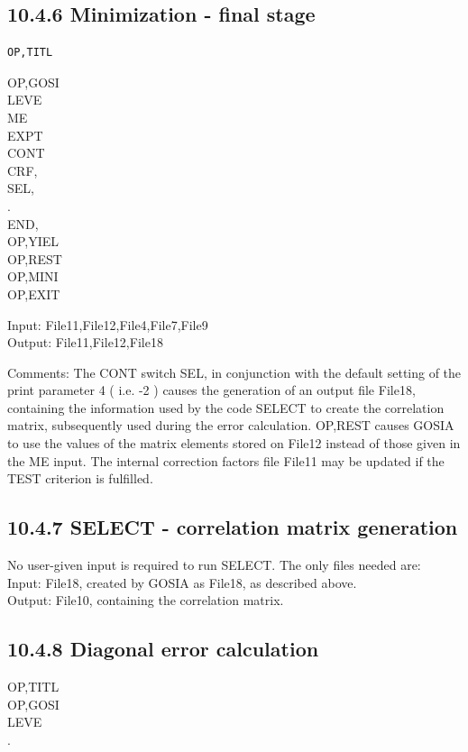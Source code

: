 \documentclass[10pt]{article}
\begin{document}
\subsection*{10.4.6 Minimization - final stage}
\begin{verbatim}
OP,TITL
\end{verbatim}

OP,GOSI\\
LEVE\\
ME\\
EXPT\\
CONT\\
CRF,\\
SEL,\\
.\\
END,\\
OP,YIEL\\
OP,REST\\
OP,MINI\\
OP,EXIT

Input: File11,File12,File4,File7,File9\\
Output: File11,File12,File18

Comments: The CONT switch SEL, in conjunction with the default setting of the print parameter 4 ( i.e. -2 ) causes the generation of an output file File18, containing the information used by the code SELECT to create the correlation matrix, subsequently used during the error calculation. OP,REST causes GOSIA to use the values of the matrix elements stored on File12 instead of those given in the ME input. The internal correction factors file File11 may be updated if the TEST criterion is fulfilled.

\subsection*{10.4.7 SELECT - correlation matrix generation}
No user-given input is required to run SELECT. The only files needed are:\\
Input: File18, created by GOSIA as File18, as described above.\\
Output: File10, containing the correlation matrix.

\subsection*{10.4.8 Diagonal error calculation}
OP,TITL\\
OP,GOSI\\
LEVE\\
.
\end{document}
